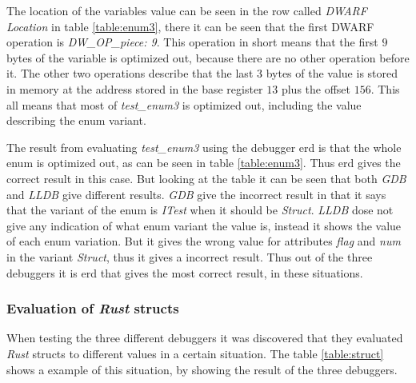 The location of the variables value can be seen in the row called \emph{DWARF Location} in table \ref{table:enum3}, there it can be seen that the first \gls{DWARF} operation is \emph{DW\_OP\_piece: 9}.
This operation in short means that the first $9$ bytes of the variable is optimized out, because there are no other operation before it.
The other two operations describe that the last $3$ bytes of the value is stored in memory at the address stored in the base register $13$ plus the offset $156$.
This all means that most of \emph{test\_enum3} is optimized out, including the value describing the enum variant.


The result from evaluating \emph{test\_enum3} using the debugger \gls{erd} is that the whole enum is optimized out, as can be seen in table \ref{table:enum3}.
Thus \gls{erd} gives the correct result in this case.
But looking at the table it can be seen that both \emph{GDB} and \emph{LLDB} give different results.
\emph{GDB} give the incorrect result in that it says that the variant of the enum is \emph{ITest} when it should be \emph{Struct}.
\emph{LLDB} dose not give any indication of what enum variant the value is, instead it shows the value of each enum variation.
But it gives the wrong value for attributes \emph{flag} and \emph{num} in the variant \emph{Struct}, thus it gives a incorrect result.
Thus out of the three debuggers it is \gls{erd} that gives the most correct result, in these situations.



\subsubsection{Evaluation of \emph{Rust} structs}
When testing the three different debuggers it was discovered that they evaluated \emph{Rust} structs to different values in a certain situation.
The table \ref{table:struct} shows a example of this situation, by showing the result of the three debuggers.


